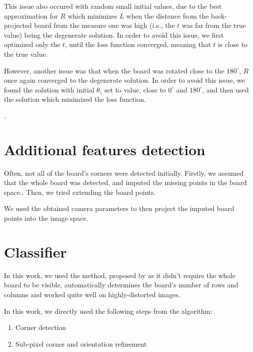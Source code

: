 This issue also occured with random small initial values, due to the best
approximation for \(R\) which minimizes \(L\) when the distance from the
back-projected board from the measure one was high (i.e., the \(t\) was far from
the true value) being the degenerate solution. In order to avoid this issue, we first optimized only the \(t\),
until the loss function converged, meaning that \(t\) is close to the true
value.

However, another issue was that when the board was rotated close to the
\(180^{\circ}\), \(R\) once again converged to the degenerate solution. In order
to avoid this issue, we found the solution with initial \(\theta_z\) set to
value, close to \(0^{\circ}\) and \(180^{\circ}\), and then used the solution
which minimized the loss function.

.

\section{Additional features detection}\label{sec:additional_features_detection}

Often, not all of the board's corners were detected initially. Firstly, we
assumed that the whole board was detected, and imputed the missing points in the
board space.. Then, we tried extending the board
points.


We used the obtained camera parameters to then project the imputed board points
into the image space.

\section{Classifier}\label{sec:classifier}

In this work, we used the method, proposed by
\cite{geigerAutomaticCameraRange2012} as it didn't require the whole board to be
visible, automatically determines the board's number of rows and columns and
worked quite well on highly-distorted images.

In this work, we directly used the following steps from the algorithm:
\begin{enumerate}
	\item Corner detection
	\item Sub-pixel corner and orientation refinement
\end{enumerate}

